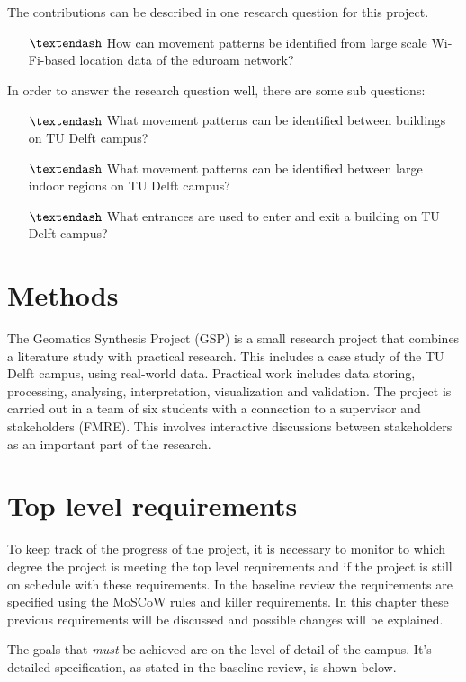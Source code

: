 The contributions can be described in one research question for this project.
\begin{itemize}
\item[$\textendash$] How can movement patterns be identified from large scale Wi-Fi-based location data of the eduroam network?
\end{itemize}
In order to answer the research question well, there are some sub questions:
\begin{itemize}
\item[$\textendash$] What movement patterns can be identified between buildings on TU Delft campus?
\item[$\textendash$] What movement patterns can be identified between large indoor regions on TU Delft campus?
\item[$\textendash$] What entrances are used to enter and exit a building on TU Delft campus?
\end{itemize}


\section{Methods}\label{methods}
The Geomatics Synthesis Project (GSP) is a small research project that combines a literature study with practical research. This includes a case study of the TU Delft campus, using real-world data. Practical work includes data storing, processing, analysing, interpretation, visualization and validation. The project is carried out in a team of six students with a connection to a supervisor and stakeholders (FMRE). This involves interactive discussions between stakeholders as an important part of the research. 

\section{Top level requirements}
To keep track of the progress of the project, it is necessary to monitor to which degree the project is meeting the top level requirements and if the project is still on schedule with these requirements. In the baseline review the requirements are specified using the MoSCoW rules and killer requirements. In this chapter these previous requirements will be discussed and possible changes will be explained.

The goals that \textit{must} be achieved are on the level of detail of the campus. It’s detailed specification, as stated in the baseline review, is shown below. 

